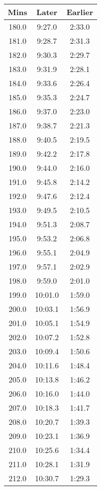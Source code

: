 \begin{footnotesize}
\begin{minipage}{0.25\textwidth}
\begin{tabular}[t]{c|c|c}
		\end{tabular}\end{minipage}
\begin{minipage}{0.25\textwidth}\begin{tabular}[t]{c|c|c}
			Mins&Later&Earlier\\\hline
	180.0&9:27.0&2:33.0\\\hline
	181.0&9:28.7&2:31.3\\\hline
	182.0&9:30.3&2:29.7\\\hline
	183.0&9:31.9&2:28.1\\\hline
	184.0&9:33.6&2:26.4\\\hline
	185.0&9:35.3&2:24.7\\\hline
	186.0&9:37.0&2:23.0\\\hline
	187.0&9:38.7&2:21.3\\\hline
	188.0&9:40.5&2:19.5\\\hline
	189.0&9:42.2&2:17.8\\\hline
	190.0&9:44.0&2:16.0\\\hline
	191.0&9:45.8&2:14.2\\\hline
	192.0&9:47.6&2:12.4\\\hline
	193.0&9:49.5&2:10.5\\\hline
	194.0&9:51.3&2:08.7\\\hline
	195.0&9:53.2&2:06.8\\\hline
	196.0&9:55.1&2:04.9\\\hline
	197.0&9:57.1&2:02.9\\\hline
	198.0&9:59.0&2:01.0\\\hline
	199.0&10:01.0&1:59.0\\\hline
	200.0&10:03.1&1:56.9\\\hline
	201.0&10:05.1&1:54.9\\\hline
	202.0&10:07.2&1:52.8\\\hline
	203.0&10:09.4&1:50.6\\\hline
	204.0&10:11.6&1:48.4\\\hline
	205.0&10:13.8&1:46.2\\\hline
	206.0&10:16.0&1:44.0\\\hline
	207.0&10:18.3&1:41.7\\\hline
	208.0&10:20.7&1:39.3\\\hline
	209.0&10:23.1&1:36.9\\\hline
	210.0&10:25.6&1:34.4\\\hline
	211.0&10:28.1&1:31.9\\\hline
	212.0&10:30.7&1:29.3\\\hline

\end{tabular}
\end{minipage}
\end{footnotesize}
